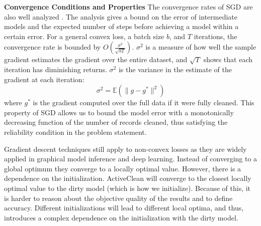 \noindent\textbf{Convergence Conditions and Properties}
The convergence rates of SGD are also well analyzed \cite{dekel2012optimal,bertsekas2011incremental,zhao2014stochastic}. 
The analysis gives a bound on the error of intermediate models and the expected number of steps before achieving a model within a certain error. 
For a general convex loss, a batch size $b$, and $T$ iterations, the convergence rate is bounded by $O(\frac{\sigma^2}{\sqrt{bT}})$. 
$\sigma^2$ is a measure of how well the sample gradient estimates the gradient over the entire dataset, and $\sqrt{T}$ shows that each iteration has diminishing returns.
$\sigma^2$ is the variance in the estimate of the gradient at each iteration:
\[
\sigma^2 = \mathbb{E}(\|g - g^*\|^2)
\]
where $g^*$ is the gradient computed over the full data if it were fully cleaned.
This property of SGD allows us to bound the model error with a monotonically decreasing function of the number of records cleaned, thus satisfying the reliability condition in the problem statement.

Gradient descent techniques still apply to non-convex losses as they are widely applied in graphical model inference and deep learning. Instead of converging to a global optimum
they converge to a locally optimal value. However, there is a dependence on the initialization.
ActiveClean will converge to the closest locally optimal value to
the dirty model (which is how we initialize). Because of this, it is harder to reason about
the objective quality of the results and to define accuracy.
 Different initializations will lead to different local
optima, and thus, introduces a complex dependence on the
initialization with the dirty model.

